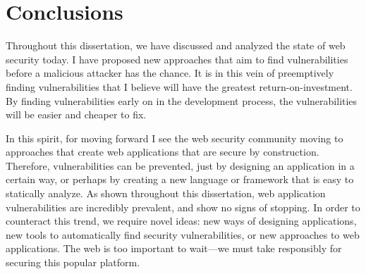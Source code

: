 \chapter{Conclusions}

Throughout this dissertation, we have discussed and analyzed the state
of web security today. I have proposed new approaches that aim to
find vulnerabilities before a malicious attacker has the chance. It is
in this vein of preemptively finding vulnerabilities that I believe
will have the greatest return-on-investment. By finding
vulnerabilities early on in the development process, the
vulnerabilities will be easier and cheaper to fix. 

In this spirit, for moving forward I see the web security community
moving to approaches that create web applications that are secure by
construction. Therefore, vulnerabilities can be prevented, just by
designing an application in a certain way, or perhaps by creating a
new language or framework that is easy to statically analyze. As shown
throughout this dissertation, web application vulnerabilities are
incredibly prevalent, and show no signs of stopping. In order to
counteract this trend, we require novel ideas: new ways of designing
applications, new tools to automatically find security
vulnerabilities, or new approaches to web applications. The web is too
important to wait---we must take responsibly for securing this popular
platform.
 
